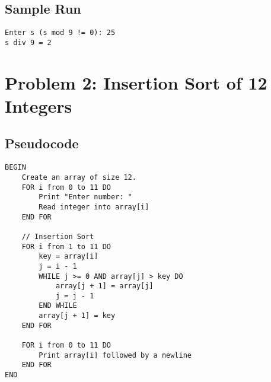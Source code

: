 \documentclass[a4paper]{article}
\begin{document}
\vspace{2mm}
\subsection*{Sample Run}
\begin{verbatim}
Enter s (s mod 9 != 0): 25
s div 9 = 2
\end{verbatim}

\newpage

\section*{Problem 2: Insertion Sort of 12 Integers}

\subsection*{Pseudocode}
\begin{verbatim}
BEGIN
    Create an array of size 12.
    FOR i from 0 to 11 DO
        Print "Enter number: "
        Read integer into array[i]
    END FOR
    
    // Insertion Sort
    FOR i from 1 to 11 DO
        key = array[i]
        j = i - 1
        WHILE j >= 0 AND array[j] > key DO
            array[j + 1] = array[j]
            j = j - 1
        END WHILE
        array[j + 1] = key
    END FOR

    FOR i from 0 to 11 DO
        Print array[i] followed by a newline
    END FOR
END
\end{verbatim}

\vspace{2mm}
\end{document}
